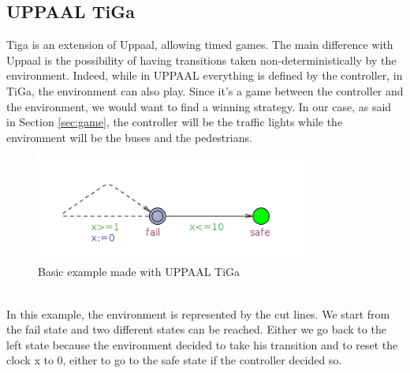 \subsection{UPPAAL TiGa}
 Tiga is an extension of Uppaal, allowing timed games. The main difference with Uppaal is the possibility of having transitions taken non-deterministically by the environment. Indeed, while in UPPAAL everything is defined by the controller, in TiGa, the environment can also play. Since it's a game between the controller and the environment, we would want to find a winning strategy. In our case, as said in Section \ref{sec:game}, the controller will be the traffic lights while the environment will be the buses and the pedestrians.
 \begin{figure}[h]\label{fig:tiga}
  \begin{center}
    \includegraphics[width=0.8\textwidth]{picture/tiga.png}
    \caption{Basic example made with UPPAAL TiGa}
  \end{center}
\end{figure} \\
In this example, the environment is represented by the cut lines. We start from the fail state and two different states can be reached. Either we go back to the left state because the environment decided to take his transition and to reset the clock x to 0, either to go to the safe state if the controller decided so. 